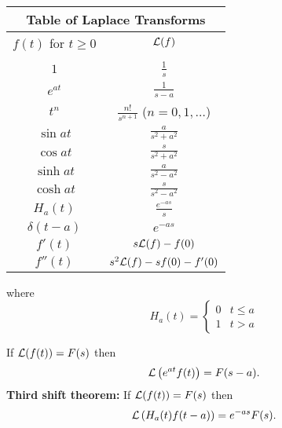 \documentclass[12pt,a4paper]{article}
\begin{document}
\thispagestyle{empty}
\begin{center}
\begin{tabular}{|c|c|}
\hline
\multicolumn{2}{|c|}{\bf Table of Laplace Transforms}\\
\hline
$ f(t)$ { for} $t \geq 0$ &  ${\cal L}(f)$\\
\hline
&\\[1mm]
$1$      & $\displaystyle \frac{1}{s}$\\[5mm]
$e^{at}$ & $\displaystyle \frac{1}{s-a}$\\[5mm]
$t^n$    & $\displaystyle \frac{n!}{s^{n+1}}$ ($n = 0,1, \ldots$)\\[5mm]
$\sin at$ & $\displaystyle \frac{a}{s^2 + a^2}$\\[5mm]
$\cos at$ & $\displaystyle \frac{s}{s^2 + a^2}$\\[5mm]
$\sinh at$ & $\displaystyle \frac{a}{s^2 - a^2}$\\[5mm]
$\cosh at$ & $\displaystyle \frac{s}{s^2 - a^2}$\\[5mm]
$H_a(t)$ & $\displaystyle \frac{e^{-as}}{s}$\\[5mm]
$\delta(t-a)$ & $\displaystyle e^{-as}$\\[5mm]
$f'(t)$ & $s{\cal L}(f)-f(0)$\\[5mm]
$f''(t)$ & $s^2{\cal L}(f)-sf(0)-f'(0)$
\\[6mm]
\hline
\end{tabular}
\end{center}
where 
\[
H_a(t)=\left\{\begin{array}{ll}0&t \le a\\1&t>a\end{array}\right.
\]

 If ${\cal L}(f(t))=F(s)$ then
\[ {\cal L}\left(e^{at}f(t)\right)=F(s-a).\]
{\bf Third shift theorem:} If ${\cal L}(f(t))=F(s)$ then
\[ {\cal L}\left(H_a(t)f(t-a)\right)=e^{-as}F(s).\]
\end{document}
